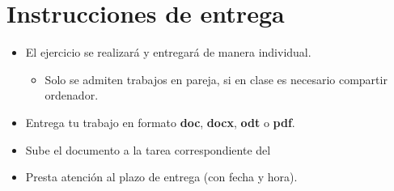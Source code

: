 \section{Instrucciones de entrega}
\begin{itemize}
\item El ejercicio se realizará y entregará de manera individual.
  \begin{itemize}
  \item Solo se admiten trabajos en pareja, si en clase es necesario compartir ordenador.
  \end{itemize}
\item Entrega tu trabajo en formato \textbf{doc}, \textbf{docx}, \textbf{odt} o \textbf{pdf}.
\item Sube el documento a la tarea correspondiente del 
\item Presta atención al plazo de entrega (con fecha y hora).
  
\end{itemize}

